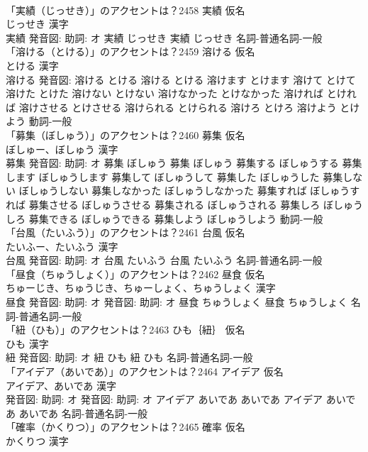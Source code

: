 \documentclass[8pt]{extreport}
\begin{document}
\begin{CJK}{UTF8}{min}
\\	「実績（じっせき）」のアクセントは？2458	実績 仮名　
\\	じっせき 漢字　
\\	実績 発音図: 助詞: オ	実績 じっせき		実績 じっせき				名詞-普通名詞-一般 
\\	「溶ける（とける）」のアクセントは？2459	溶ける 仮名　
\\	とける 漢字　
\\	溶ける 発音図:	溶ける とける		溶ける とける 溶けます とけます 溶けて とけて 溶けた とけた 溶けない とけない 溶けなかった とけなかった 溶ければ とければ 溶けさせる とけさせる 溶けられる とけられる 溶けろ とけろ 溶けよう とけよう				動詞-一般 
\\	「募集（ぼしゅう）」のアクセントは？2460	募集 仮名　
\\	ぼしゅー、ぼしゅう 漢字　
\\	募集 発音図: 助詞: オ	募集 ぼしゅう		募集 ぼしゅう 募集する ぼしゅうする 募集します ぼしゅうします 募集して ぼしゅうして 募集した ぼしゅうした 募集しない ぼしゅうしない 募集しなかった ぼしゅうしなかった 募集すれば ぼしゅうすれば 募集させる ぼしゅうさせる 募集される ぼしゅうされる 募集しろ ぼしゅうしろ 募集できる ぼしゅうできる 募集しよう ぼしゅうしよう				動詞-一般 
\\	「台風（たいふう）」のアクセントは？2461	台風 仮名　
\\	たいふー、たいふう 漢字　
\\	台風 発音図: 助詞: オ	台風 たいふう		台風 たいふう				名詞-普通名詞-一般 
\\	「昼食（ちゅうしょく）」のアクセントは？2462	昼食 仮名　
\\	ちゅーじき、ちゅうじき、ちゅーしょく、ちゅうしょく 漢字　
\\	昼食 発音図: 助詞: オ 発音図: 助詞: オ	昼食 ちゅうしょく		昼食 ちゅうしょく				名詞-普通名詞-一般 
\\	「紐（ひも）」のアクセントは？2463	ひも｛紐｝ 仮名　
\\	ひも 漢字　
\\	紐 発音図: 助詞: オ	紐 ひも		紐 ひも				名詞-普通名詞-一般 
\\	「アイデア（あいであ）」のアクセントは？2464	アイデア 仮名　
\\	アイデア、あいであ 漢字　
\\	発音図: 助詞: オ 発音図: 助詞: オ	アイデア あいであ あいであ		アイデア あいであ あいであ				名詞-普通名詞-一般 
\\	「確率（かくりつ）」のアクセントは？2465	確率 仮名　
\\	かくりつ 漢字　

\end{CJK}
\end{document}
